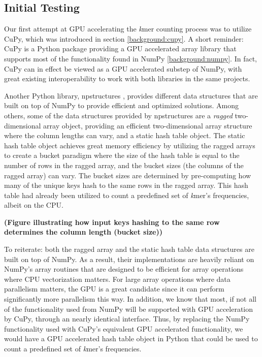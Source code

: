 \subsection{Initial Testing} \label{methods:initial_testing}
Our first attempt at GPU accelerating the \textit{k}mer counting process was to utilize CuPy, which was introduced in section \ref{background:cupy}.
A short reminder: CuPy is a Python package providing a GPU accelerated array library that supports most of the functionality found in NumPy \ref{background:numpy}.
In fact, CuPy can in effect be viewed as a GPU accelerated substep of NumPy, with great existing interoperability to work with both libraries in the same projects.

Another Python library, npstructures \cite{npstructures}, provides different data structures that are built on top of NumPy to provide efficient and optimized solutions.
Among others, some of the data structures provided by npstructures are a \textit{ragged} two-dimensional array object, providing an efficient two-dimensional array structure where the column lengths can vary, and a static hash table object.
The static hash table object achieves great memory efficiency by utilizing the ragged arrays to create a bucket paradigm where the size of the hash table is equal to the number of rows in the ragged array, and the bucket sizes (the columns of the ragged array) can vary.
The bucket sizes are determined by pre-computing how many of the unique keys hash to the same rows in the ragged array.
This hash table had already been utilized to count a predefined set of \textit{k}mer's frequencies, albeit on the CPU.

\textbf{(Figure illustrating how input keys hashing to the same row determines the column length (bucket size))}

To reiterate: both the ragged array and the static hash table data structures are built on top of NumPy.
As a result, their implementations are heavily reliant on NumPy's array routines that are designed to be efficient for array operations where CPU vectorization matters. 
For large array operations where data parallelism matters, the GPU is a great candidate since it can perform significantly more parallelism this way.
In addition, we know that most, if not all of the functionality used from NumPy will be supported with GPU acceleration by CuPy, through an nearly identical interface.
Thus, by replacing the NumPy functionality used with CuPy's equivalent GPU accelerated functionality, we would have a GPU accelerated hash table object in Python that could be used to count a predefined set of \textit{k}mer's frequencies.

